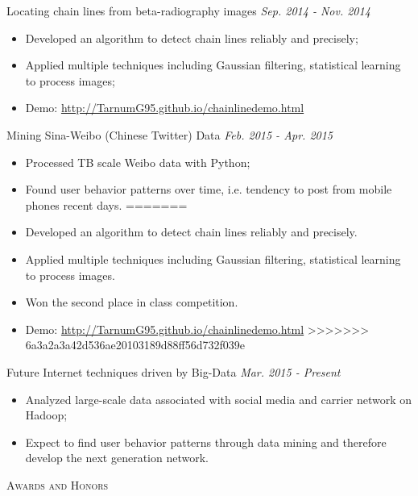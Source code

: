 \documentclass[9pt]{article}
\newenvironment{changemargin}[2]{%
  \begin{list}{}{%
    \setlength{\topsep}{0pt}%
    \setlength{\leftmargin}{#1}%
    \setlength{\rightmargin}{#2}%
    \setlength{\listparindent}{\parindent}%
    \setlength{\itemindent}{\parindent}%
    \setlength{\parsep}{\parskip}%
  }%
  \item[]}{\end{list}
}
\newcommand{\lineover}{
	\begin{changemargin}{-0.05in}{-0.05in}
		\vspace*{-8pt}
		\hrulefill \\
		\vspace*{-2pt}
	\end{changemargin}
}
\newcommand{\header}[1]{
	\begin{changemargin}{-0.5in}{-0.5in}
		\scshape{#1}\\
  	\lineover
	\end{changemargin}
}
\newenvironment{body} {
	\vspace*{-16pt}
	\begin{changemargin}{-0.25in}{-0.5in}
  }	
	{\end{changemargin}
}
\begin{document}
\begin{body}
	\vspace{14pt}
	Locating chain lines from beta-radiography images \hfill \emph{Sep. 2014 - Nov. 2014}
	\begin{itemize}
	\itemsep 0pt
<<<<<<< HEAD
	\item Developed an algorithm to detect chain lines reliably and precisely;
	\item Applied multiple techniques including Gaussian filtering, statistical learning to process images;
	\item Demo: \href{http://TarnumG95.github.io/chainlinedemo.html}{http://TarnumG95.github.io/chainlinedemo.html}
	\end{itemize}
	\smallskip
	Mining Sina-Weibo (Chinese Twitter) Data \hfill \emph{Feb. 2015 - Apr. 2015}
	\begin{itemize}
	\itemsep 0pt
	\item Processed TB scale Weibo data with Python;
	\item Found user behavior patterns over time, i.e. tendency to post from mobile phones recent days. 
=======
	\item Developed an algorithm to detect chain lines reliably and precisely. 
	\item Applied multiple techniques including Gaussian filtering, statistical learning to process images. 
	\item Won the second place in class competition. 
	\item Demo: \href{http://TarnumG95.github.io/chainlinedemo.html}{http://TarnumG95.github.io/chainlinedemo.html}
>>>>>>> 6a3a2a3a42d536ae20103189d88ff56d732f039e
	\end{itemize}
	\smallskip
	Future Internet techniques driven by Big-Data \hfill \emph{Mar. 2015 - Present}
	\begin{itemize}
	\itemsep 0pt
	\item Analyzed large-scale data associated with social media and carrier network on Hadoop;
	\item Expect to find user behavior patterns through data mining and therefore develop the next generation network. 
	\end{itemize}
	\smallskip

\end{body}
\smallskip
\smallskip

\header{Awards and Honors}
\end{document}

